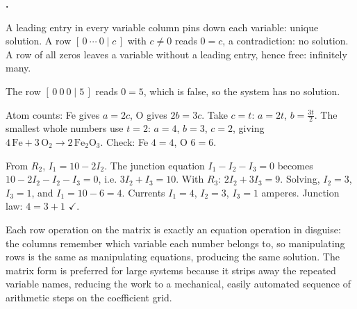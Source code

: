 \documentclass[12pt]{book}
\let\originalcheckmark\checkmark
\renewcommand{\checkmark}{\ensuremath{\originalcheckmark}}
\newcounter{soln}[section]
\newenvironment{solutions}{%
  \setcounter{soln}{0}%
  \begin{list}{\textbf{\arabic{soln}.}}{%
    \usecounter{soln}\setlength{\leftmargin}{2.2em}\setlength{\itemsep}{10pt}}%
}{\end{list}}
\begin{document}
\begin{solutions}
\item A leading entry in every variable column pins down each variable: unique
solution. A row $[\,0\ \cdots\ 0\mid c\,]$ with $c\neq0$ reads $0=c$, a contradiction:
no solution. A row of all zeros leaves a variable without a leading entry, hence free:
infinitely many.

\item The row $[\,0\ 0\ 0\mid 5\,]$ reads $0=5$, which is false, so the system has no
solution.

\item Atom counts: Fe gives $a=2c$, O gives $2b=3c$. Take $c=t$: $a=2t$,
$b=\tfrac{3t}{2}$. The smallest whole numbers use $t=2$: $a=4$, $b=3$, $c=2$, giving
$4\,\mathrm{Fe}+3\,\mathrm{O_2}\to2\,\mathrm{Fe_2O_3}$. Check: Fe $4=4$, O $6=6$.

\item From $R_2$, $I_1=10-2I_2$. The junction equation $I_1-I_2-I_3=0$ becomes
$10-2I_2-I_2-I_3=0$, i.e. $3I_2+I_3=10$. With $R_3$: $2I_2+3I_3=9$. Solving,
$I_2=3$, $I_3=1$, and $I_1=10-6=4$. Currents $I_1=4$, $I_2=3$, $I_3=1$ amperes. Junction
law: $4=3+1$ \checkmark.

\item Each row operation on the matrix is exactly an equation operation in disguise:
the columns remember which variable each number belongs to, so manipulating rows is the
same as manipulating equations, producing the same solution. The matrix form is
preferred for large systems because it strips away the repeated variable names,
reducing the work to a mechanical, easily automated sequence of arithmetic steps on the
coefficient grid.
\end{solutions}
\end{document}

